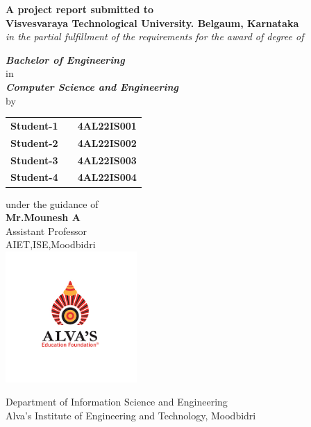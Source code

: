 \documentclass{article}
\begin{document}
\begin{center}
 \vspace*{1.2cm}
 \noindent \textbf{A project report submitted to \\Visvesvaraya Technological 
University. Belgaum, Karnataka }\\
 \textit{in the partial fulfillment of the requirements for the award of degree of} \\
 
 \begin{normalsize}
\textbf{\textit{Bachelor of Engineering }} \\
in \\
\textbf{\textit{Computer Science and Engineering}} \\
by \\
\end{normalsize}
 
 
\begin{tabular}{ccc}
\textbf{Student-1 }& & \textbf{4AL22IS001}\\
\textbf{Student-2 }& & \textbf{4AL22IS002}\\
\textbf{Student-3 }& & \textbf{4AL22IS003}\\
\textbf{Student-4 }& & \textbf{4AL22IS004}\\
\end{tabular}
\vfill
{\normalsize under the guidance of}\\
\Large{\textbf{Mr.Mounesh A}}\\
Assistant Professor\\
AIET,ISE,Moodbidri\\
 
 \includegraphics[width=5cm]{alvas-logo.png}
 
 Department of Information Science and Engineering\\
 Alva's Institute of Engineering and Technology, Moodbidri 
\end{center}
\end{document}
